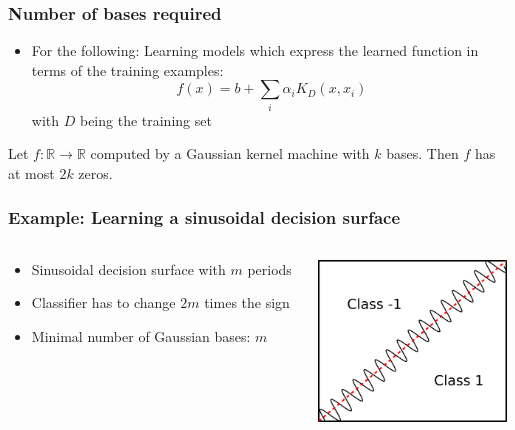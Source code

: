 \begin{frame}
	\frametitle{Number of bases required}
	\begin{itemize}
		\item For the following: Learning models which express the learned function in terms of the training examples:
		\begin{displaymath}
			f(x) = b + \sum_{i} \alpha_i K_D(x,x_i)
		\end{displaymath}
		with $D$ being the training set
	\end{itemize}
	
	\begin{theorem}
		Let $f:\mathbb{R}\rightarrow \mathbb{R}$ computed by a Gaussian kernel machine with $k$ bases. Then $f$ has at most $2k$ zeros. \cite{Schmitt:02}
	\end{theorem}
\end{frame}

\begin{frame}
	\frametitle{Example: Learning a sinusoidal decision surface}
	\begin{columns}
		\begin{column}{6cm}
			\begin{itemize}
				\item Sinusoidal decision surface with $m$ periods
				\item Classifier has to change $2m$ times the sign
				\item Minimal number of Gaussian bases: $m$
			\end{itemize}
		\end{column}
		\begin{column}{5cm}
			\includegraphics[width=5cm]{images/sinusoidal.png}
		\end{column}
	\end{columns}
\end{frame}

